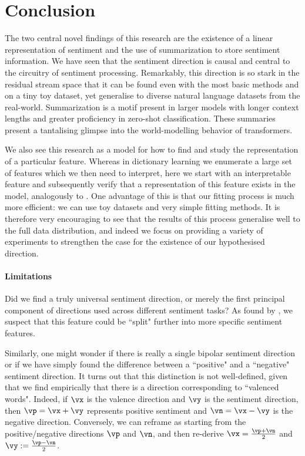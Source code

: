 \documentclass{article} %
\begin{document}
\section{Conclusion}\label{section:discussion}
The two central novel findings of this research are the existence of a linear representation of sentiment and the use of summarization to store sentiment information. We have seen that the sentiment direction is causal and central to the circuitry of sentiment processing. Remarkably, this direction is so stark in the residual stream space that it can be found even with the most basic methods and on a tiny toy dataset, yet generalise to diverse natural language datasets from the real-world. Summarization is a motif present in larger models with longer context lengths and greater proficiency in zero-shot classification. These summaries present a tantalising glimpse into the world-modelling behavior of transformers. 

We also see this research as a model for how to find and study the representation of a particular feature. Whereas in dictionary learning \citep{bricken2023monosemanticity} we enumerate a large set of features which we then need to interpret, here we start with an interpretable feature and subsequently verify that a representation of this feature exists in the model, analogously to \citet{zou2023representation}. One advantage of this is that our fitting process is much more efficient: we can use toy datasets and very simple fitting methods. It is therefore very encouraging to see that the results of this process generalise well to the full data distribution, and indeed we focus on providing a variety of experiments to strengthen the case for the existence of our hypothesised direction.

\paragraph{Limitations}\label{section:limitations}
Did we find a truly universal sentiment direction, or merely the first principal component of directions used across different sentiment tasks? As found by \citet{bricken2023monosemanticity}, we suspect that this feature could be ``split" further into more specific sentiment features.

Similarly, one might wonder if there is really a single bipolar sentiment direction or if we have simply found the difference between a ``positive" and a ``negative" sentiment direction. It turns out that this distinction is not well-defined, given that we find empirically that there is a direction corresponding to ``valenced words". Indeed, if $\vx$ is the valence direction and $\vy$ is the sentiment direction, then $\vp=\vx+\vy$ represents positive sentiment and $\vn=\vx-\vy$ is the negative direction. Conversely, we can reframe as starting from the positive/negative directions $\vp$ and $\vn$, and then re-derive $\vx=\frac{\vp+\vn}{2}$ and $\vy:=\frac{\vp-\vn}{2}$.
\end{document}
